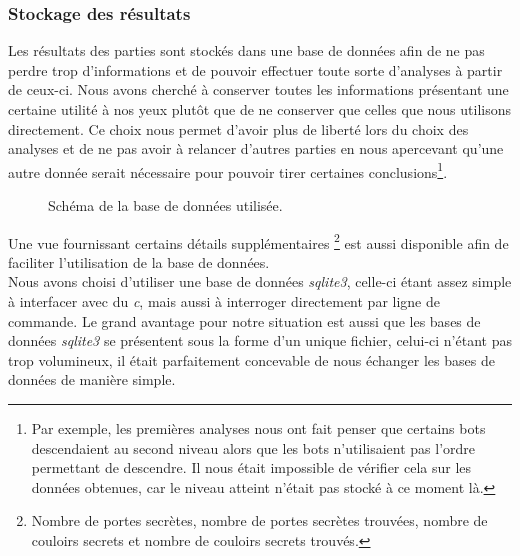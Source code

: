 \documentclass[a4paper,12pt]{article}
\begin{document}
\subsubsection{Stockage des résultats}
Les résultats des parties sont stockés dans une base de données afin de ne pas
perdre trop d'informations et de pouvoir effectuer toute sorte d'analyses à
partir de ceux-ci. Nous avons cherché à conserver toutes les informations
présentant une certaine utilité à nos yeux plutôt que de ne conserver que celles
que nous utilisons directement. Ce choix nous permet d'avoir plus de liberté
lors du choix des analyses et de ne pas avoir à relancer d'autres parties en
nous apercevant qu'une autre donnée serait nécessaire pour pouvoir tirer
certaines conclusions\footnote{Par exemple, les premières analyses nous ont fait
  penser que certains bots descendaient au second niveau alors que les bots
  n'utilisaient pas l'ordre permettant de descendre. Il nous était impossible de
  vérifier cela sur les données obtenues, car le niveau atteint n'était pas
  stocké à ce moment là.}.
\begin{figure}[H]
	\caption{\label{fig:schema} Schéma de la base de données utilisée.}
\end{figure}
Une vue
fournissant certains détails supplémentaires \footnote{Nombre de portes
secrètes, nombre de portes secrètes trouvées, nombre de couloirs secrets et
nombre de couloirs secrets trouvés.} est aussi disponible afin de faciliter
l'utilisation de la base de données.
\\
Nous avons choisi d'utiliser une base de données {\em sqlite3}, celle-ci étant
assez simple à interfacer avec du {\em c}, mais aussi à interroger directement
par ligne de commande. Le grand avantage pour notre situation est aussi que les
bases de données {\em sqlite3} se présentent sous la forme d'un unique fichier,
celui-ci n'étant pas trop volumineux, il était parfaitement concevable de nous
échanger les bases de données de manière simple.
\end{document}
